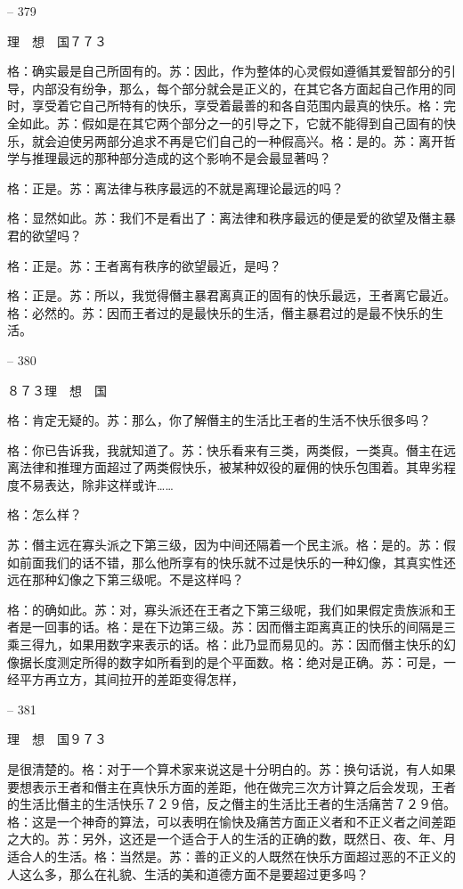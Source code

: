 \documentclass[11pt,oneside]{book}
\begin{document}
\begin{common-format}
    

-- 379

    理　想　国７７３

    格：确实最是自己所固有的。苏：因此，作为整体的心灵假如遵循其爱智部分的引导，内部没有纷争，那么，每个部分就会是正义的，在其它各方面起自己作用的同时，享受着它自己所特有的快乐，享受着最善的和各自范围内最真的快乐。格：完全如此。苏：假如是在其它两个部分之一的引导之下，它就不能得到自己固有的快乐，就会迫使另两部分追求不再是它们自己的一种假高兴。格：是的。苏：离开哲学与推理最远的那种部分造成的这个影响不是会最显著吗？

    格：正是。苏：离法律与秩序最远的不就是离理论最远的吗？

    格：显然如此。苏：我们不是看出了：离法律和秩序最远的便是爱的欲望及僭主暴君的欲望吗？

    格：正是。苏：王者离有秩序的欲望最近，是吗？

    格：正是。苏：所以，我觉得僭主暴君离真正的固有的快乐最远，王者离它最近。格：必然的。苏：因而王者过的是最快乐的生活，僭主暴君过的是最不快乐的生活。

    

-- 380

    ８７３理　想　国

    格：肯定无疑的。苏：那么，你了解僭主的生活比王者的生活不快乐很多吗？

    格：你已告诉我，我就知道了。苏：快乐看来有三类，两类假，一类真。僭主在远离法律和推理方面超过了两类假快乐，被某种奴役的雇佣的快乐包围着。其卑劣程度不易表达，除非这样或许……

    格：怎么样？

    苏：僭主远在寡头派之下第三级，因为中间还隔着一个民主派。格：是的。苏：假如前面我们的话不错，那么他所享有的快乐就不过是快乐的一种幻像，其真实性还远在那种幻像之下第三级呢。不是这样吗？

    格：的确如此。苏：对，寡头派还在王者之下第三级呢，我们如果假定贵族派和王者是一回事的话。格：是在下边第三级。苏：因而僭主距离真正的快乐的间隔是三乘三得九，如果用数字来表示的话。格：此乃显而易见的。苏：因而僭主快乐的幻像据长度测定所得的数字如所看到的是个平面数。格：绝对是正确。苏：可是，一经平方再立方，其间拉开的差距变得怎样，

    

-- 381

    理　想　国９７３

    是很清楚的。格：对于一个算术家来说这是十分明白的。苏：换句话说，有人如果要想表示王者和僭主在真快乐方面的差距，他在做完三次方计算之后会发现，王者的生活比僭主的生活快乐７２９倍，反之僭主的生活比王者的生活痛苦７２９倍。格：这是一个神奇的算法，可以表明在愉快及痛苦方面正义者和不正义者之间差距之大的。苏：另外，这还是一个适合于人的生活的正确的数，既然日、夜、年、月适合人的生活。格：当然是。苏：善的正义的人既然在快乐方面超过恶的不正义的人这么多，那么在礼貌、生活的美和道德方面不是要超过更多吗？


\end{common-format}
\end{document}
